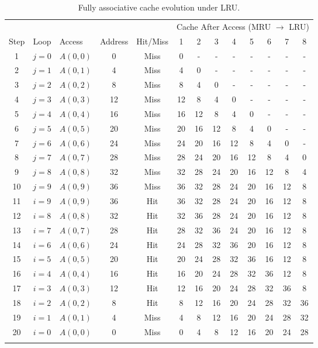 \documentclass{article}
\begin{document}
\scriptsize
\setlength{\tabcolsep}{3.5pt}
\begin{longtable}{@{}cclcc*{8}{c}@{}}
\toprule
& & & & & \multicolumn{8}{c}{Cache After Access (MRU $\rightarrow$ LRU)} \\
\cmidrule(l){6-13}
Step & Loop & Access & Address & Hit/Miss & 1 & 2 & 3 & 4 & 5 & 6 & 7 & 8 \\
\midrule
\endhead
1 & $j=0$ & $A(0,0)$ & 0 & Miss & 0 & - & - & - & - & - & - & - \\
2 & $j=1$ & $A(0,1)$ & 4 & Miss & 4 & 0 & - & - & - & - & - & - \\
3 & $j=2$ & $A(0,2)$ & 8 & Miss & 8 & 4 & 0 & - & - & - & - & - \\
4 & $j=3$ & $A(0,3)$ & 12 & Miss & 12 & 8 & 4 & 0 & - & - & - & - \\
5 & $j=4$ & $A(0,4)$ & 16 & Miss & 16 & 12 & 8 & 4 & 0 & - & - & - \\
6 & $j=5$ & $A(0,5)$ & 20 & Miss & 20 & 16 & 12 & 8 & 4 & 0 & - & - \\
7 & $j=6$ & $A(0,6)$ & 24 & Miss & 24 & 20 & 16 & 12 & 8 & 4 & 0 & - \\
8 & $j=7$ & $A(0,7)$ & 28 & Miss & 28 & 24 & 20 & 16 & 12 & 8 & 4 & 0 \\
9 & $j=8$ & $A(0,8)$ & 32 & Miss & 32 & 28 & 24 & 20 & 16 & 12 & 8 & 4 \\
10 & $j=9$ & $A(0,9)$ & 36 & Miss & 36 & 32 & 28 & 24 & 20 & 16 & 12 & 8 \\
11 & $i=9$ & $A(0,9)$ & 36 & Hit & 36 & 32 & 28 & 24 & 20 & 16 & 12 & 8 \\
12 & $i=8$ & $A(0,8)$ & 32 & Hit & 32 & 36 & 28 & 24 & 20 & 16 & 12 & 8 \\
13 & $i=7$ & $A(0,7)$ & 28 & Hit & 28 & 32 & 36 & 24 & 20 & 16 & 12 & 8 \\
14 & $i=6$ & $A(0,6)$ & 24 & Hit & 24 & 28 & 32 & 36 & 20 & 16 & 12 & 8 \\
15 & $i=5$ & $A(0,5)$ & 20 & Hit & 20 & 24 & 28 & 32 & 36 & 16 & 12 & 8 \\
16 & $i=4$ & $A(0,4)$ & 16 & Hit & 16 & 20 & 24 & 28 & 32 & 36 & 12 & 8 \\
17 & $i=3$ & $A(0,3)$ & 12 & Hit & 12 & 16 & 20 & 24 & 28 & 32 & 36 & 8 \\
18 & $i=2$ & $A(0,2)$ & 8 & Hit & 8 & 12 & 16 & 20 & 24 & 28 & 32 & 36 \\
19 & $i=1$ & $A(0,1)$ & 4 & Miss & 4 & 8 & 12 & 16 & 20 & 24 & 28 & 32 \\
20 & $i=0$ & $A(0,0)$ & 0 & Miss & 0 & 4 & 8 & 12 & 16 & 20 & 24 & 28 \\
\bottomrule
\caption{Fully associative cache evolution under LRU.}
\end{longtable}
\normalsize
\end{document}
